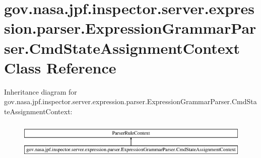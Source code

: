 \hypertarget{classgov_1_1nasa_1_1jpf_1_1inspector_1_1server_1_1expression_1_1parser_1_1_expression_grammar_padaf6f2235297f2d833b81c76746458f3}{}\section{gov.\+nasa.\+jpf.\+inspector.\+server.\+expression.\+parser.\+Expression\+Grammar\+Parser.\+Cmd\+State\+Assignment\+Context Class Reference}
\label{classgov_1_1nasa_1_1jpf_1_1inspector_1_1server_1_1expression_1_1parser_1_1_expression_grammar_padaf6f2235297f2d833b81c76746458f3}
Inheritance diagram for gov.\+nasa.\+jpf.\+inspector.\+server.\+expression.\+parser.\+Expression\+Grammar\+Parser.\+Cmd\+State\+Assignment\+Context\+:\begin{figure}[H]
\begin{center}
\leavevmode
\includegraphics[height=1.833061cm]{classgov_1_1nasa_1_1jpf_1_1inspector_1_1server_1_1expression_1_1parser_1_1_expression_grammar_padaf6f2235297f2d833b81c76746458f3}
\end{center}
\end{figure}
